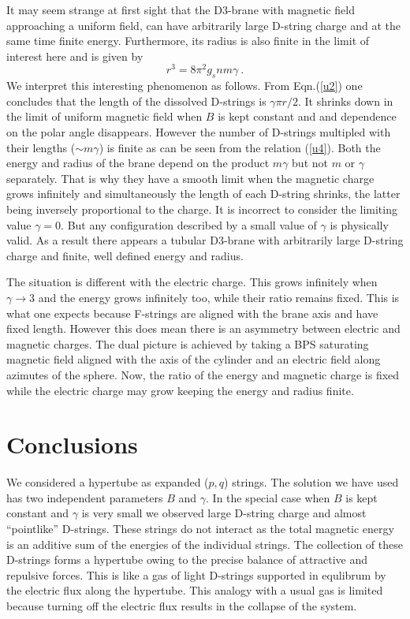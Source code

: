 \documentclass[a4paper,12pt]{article}
\begin{document}
It may seem strange at first sight that the D3-brane with magnetic field approaching a uniform field, can have arbitrarily large D-string charge and at the same time finite energy. Furthermore, its radius is also finite in the limit of interest here and is given by
\begin{equation}
r^3=8\pi^2g_snm\gamma\ .
\label{u5}
\end{equation}
We interpret this interesting phenomenon as follows. From Eqn.(\ref{u2}) one concludes that the length of the dissolved D-strings is $\gamma\pi r/2$. It shrinks down in the limit of uniform magnetic field when $B$ is kept constant and and dependence on the polar angle disappears. However the number of D-strings multipled with their lengths ($\sim m\gamma$) is finite as can be seen from the relation (\ref{u4}). Both the energy and radius of the brane depend on the product $m\gamma$ but not $m$ or $\gamma$ separately. That is why they have a smooth limit when the magnetic charge grows infinitely and simultaneously the length of each D-string shrinks, the latter being inversely proportional to the charge. It is incorrect to consider the limiting value $\gamma =0$. But any configuration described by a small value of $\gamma$ is physically valid. As a result there appears a tubular D3-brane with arbitrarily large D-string charge and finite, well defined energy and radius.


The situation is different with the electric charge. This grows infinitely when $\gamma\to 3$ and the energy grows infinitely too, while their ratio remains fixed. This is what one expects because F-strings are aligned with the brane axis and have fixed length. However this does mean there is an asymmetry between electric and magnetic charges. The dual picture is achieved by taking a BPS saturating magnetic field aligned with the axis of the cylinder and an electric field along azimutes of the sphere. Now, the ratio of the energy and magnetic charge is fixed while the electric charge may grow keeping the energy and radius finite.

\section{Conclusions}

We considered a hypertube as expanded ($p,q$) strings. The solution we have used has two independent parameters $B$ and $\gamma$. In the special case when $B$ is kept constant and $\gamma$ is very small we observed large D-string charge and almost ``pointlike'' D-strings. These strings do not interact as the total magnetic energy is an additive sum of the energies of the individual strings. The collection of these D-strings forms a hypertube owing to the precise balance of attractive and repulsive forces. This is like a gas of light D-strings supported in equlibrum by the electric flux along the hypertube. This analogy with a usual gas is limited because turning off the electric flux results in the collapse of the system. 
\end{document}
